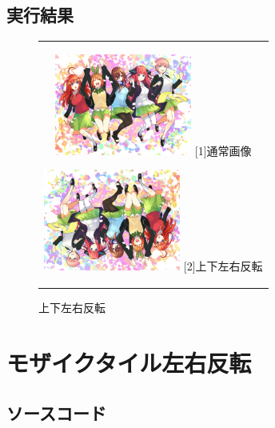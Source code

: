 \documentclass[a4paper,11pt,titlepage]{bxjsarticle}
\begin{document}
\subsection{実行結果}
\begin{figure}[htbp]
  \begin{center}
    \begin{tabular}{c}
      \begin{minipage}{0.33\hsize}
        \begin{center}
          \includegraphics[clip, width=4.5cm]{./sample.jpg}
          \hspace{1.6cm} [1]通常画像
        \end{center}
      \end{minipage}

      \begin{minipage}{0.33\hsize}
        \begin{center}
          \includegraphics[clip, width=4.5cm]{./Inversdst.jpg}
          \hspace{1.6cm} [2]上下左右反転
        \end{center}
        
      \end{minipage}
       \end{tabular}
    \caption{上下左右反転}
    \label{fig:lena}
  \end{center}
\end{figure}

\section{モザイクタイル左右反転}
\subsection{ソースコード}

\end{document}
